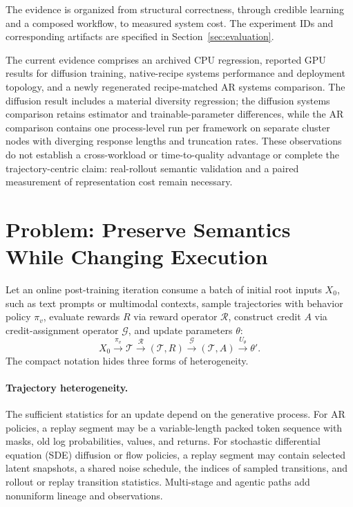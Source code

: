 \documentclass[10pt]{article}
\begin{document}
The evidence is organized from structural correctness, through credible learning and a composed workflow, to measured system cost.
The experiment IDs and corresponding artifacts are specified in Section~\ref{sec:evaluation}.

The current evidence comprises an archived CPU regression, reported GPU results for diffusion training, native-recipe systems performance and deployment topology, and a newly regenerated recipe-matched AR systems comparison.
The diffusion result includes a material diversity regression; the diffusion systems comparison retains estimator and trainable-parameter differences, while the AR comparison contains one process-level run per framework on separate cluster nodes with diverging response lengths and truncation rates.
These observations do not establish a cross-workload or time-to-quality advantage or complete the trajectory-centric claim: real-rollout semantic validation and a paired measurement of representation cost remain necessary.

\section{Problem: Preserve Semantics While Changing Execution}
\label{sec:problem}

Let an online post-training iteration consume a batch of initial root inputs $X_0$, such as text prompts or multimodal contexts, sample trajectories with behavior policy $\pi_v$, evaluate rewards $R$ via reward operator $\mathcal{R}$, construct credit $A$ via credit-assignment operator $\mathcal{G}$, and update parameters $\theta$:
\begin{equation}
X_0 \xrightarrow{\pi_v} \mathcal{T}
  \xrightarrow{\mathcal{R}} (\mathcal{T},R)
  \xrightarrow{\mathcal{G}} (\mathcal{T},A)
  \xrightarrow{U_\theta} \theta'.
\label{eq:outer-loop}
\end{equation}
The compact notation hides three forms of heterogeneity.

\paragraph{Trajectory heterogeneity.}
The sufficient statistics for an update depend on the generative process.
For AR policies, a replay segment may be a variable-length packed token sequence with masks, old log probabilities, values, and returns.
For stochastic differential equation (SDE) diffusion or flow policies, a replay segment may contain selected latent snapshots, a shared noise schedule, the indices of sampled transitions, and rollout or replay transition statistics.
Multi-stage and agentic paths add nonuniform lineage and observations.
\end{document}
